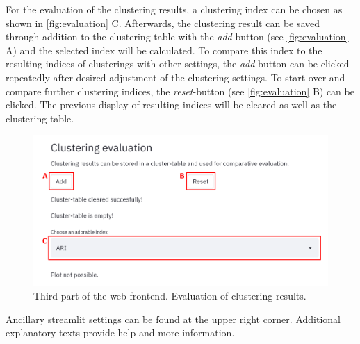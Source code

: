 For the evaluation of the clustering results, a clustering index can be chosen as shown in \autoref{fig:evaluation} C. Afterwards, the clustering result can be saved through addition to the clustering table with the \textit{add}-button (see \autoref{fig:evaluation} A) and the selected index will be calculated. To compare this index to the resulting indices of clusterings with other settings, the \textit{add}-button can be clicked repeatedly after desired adjustment of the clustering settings. To start over and compare further clustering indices, the \textit{reset}-button (see \autoref{fig:evaluation} B) can be clicked. The previous display of resulting indices will be cleared as well as the clustering table. 
\begin{figure}[H]
	\centering
	\includegraphics[width=\linewidth]{modules/web_frontend/evaluation_letters}
	\caption{Third part of the web frontend. Evaluation of clustering results.}\label{fig:evaluation}
\end{figure}


Ancillary streamlit settings can be found at the upper right corner. Additional explanatory texts provide help and more information. \\

